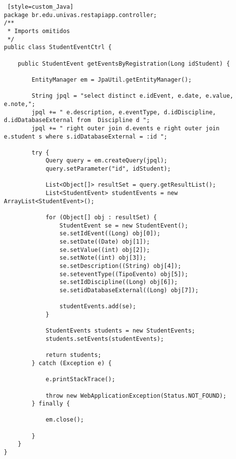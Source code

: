 \begin{lstlisting} [style=custom_Java]
package br.edu.univas.restapiapp.controller;
/**
 * Imports omitidos
 */
public class StudentEventCtrl {

	public StudentEvent getEventsByRegistration(Long idStudent) {
		
		EntityManager em = JpaUtil.getEntityManager();
		
		String jpql = "select distinct e.idEvent, e.date, e.value, e.note,";
		jpql += " e.description, e.eventType, d.idDiscipline, d.idDatabaseExternal from  Discipline d "; 
		jpql += " right outer join d.events e right outer join e.student s where s.idDatabaseExternal = :id ";

		try {
			Query query = em.createQuery(jpql);
			query.setParameter("id", idStudent);

			List<Object[]> resultSet = query.getResultList();
			List<StudentEvent> studentEvents = new ArrayList<StudentEvent>();

			for (Object[] obj : resultSet) {
				StudentEvent se = new StudentEvent();
				se.setIdEvent((Long) obj[0]);
				se.setDate((Date) obj[1]);
				se.setValue((int) obj[2]);
				se.setNote((int) obj[3]);
				se.setDescription((String) obj[4]);
				se.seteventType((TipoEvento) obj[5]);
				se.setIdDiscipline((Long) obj[6]);
				se.setidDatabaseExternal((Long) obj[7]);

				studentEvents.add(se);
			}

			StudentEvents students = new StudentEvents;
			students.setEvents(studentEvents);

			return students;
		} catch (Exception e) {

			e.printStackTrace();

			throw new WebApplicationException(Status.NOT_FOUND);
		} finally {

			em.close();

		}
	}
}
	
\end{lstlisting}
